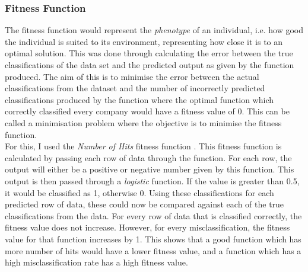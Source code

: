 \documentclass[11pt]{article}
\begin{document}
\subsubsection{Fitness Function}\label{subsubsec:fp}
The fitness function would represent the \textit{phenotype} of an individual, i.e. how good the individual is suited to its environment, representing how close it is to an optimal solution. This was done through calculating the error between the true classifications of the data set and the predicted output as given by the function produced. The aim of this is to minimise the error between the actual classifications from the dataset and the number of incorrectly predicted classifications produced by the function where the optimal function which correctly classified every company would have a fitness value of 0. This can be called a minimisation problem where the objective is to minimise the fitness function. \\
For this, I used the \textit{Number of Hits} fitness function \cite{ref-twelve} . This fitness function is calculated by passing each row of data through the function. For each row, the output will either be a positive or negative number given by this function. This output is then passed through a \textit{logistic} function. If the value is greater than 0.5, it would be classified as 1, otherwise 0. Using these classifications for each predicted row of data, these could now be compared against each of the true classifications from the data. For every row of data that is classified correctly, the fitness value does not increase. However, for every misclassification, the fitness value for that function increases by 1. This shows that a good function which has more number of hits would have a lower fitness value, and a function which has a high misclassification rate has a high fitness value. 
\end{document}
